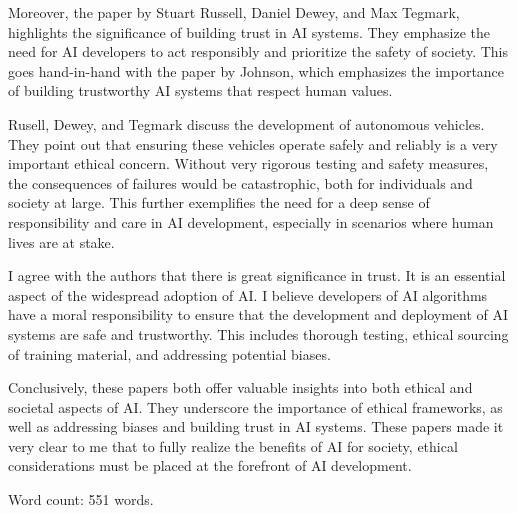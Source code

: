 \documentclass[12pt]{article}
\begin{document}
{Moreover, the paper  by Stuart Russell, Daniel Dewey, and Max Tegmark, highlights the significance of building trust in AI systems\cite{russell2015research}. They emphasize the need for AI developers to act responsibly and prioritize the safety of society. This goes hand-in-hand with the paper by Johnson, which emphasizes the importance of building trustworthy AI systems that respect human values.

Rusell, Dewey, and Tegmark discuss the development of autonomous vehicles. They point out that ensuring these vehicles operate safely and reliably is a very important ethical concern. Without very rigorous testing and safety measures, the consequences of failures would be catastrophic, both for individuals and society at large. This further exemplifies the need for a deep sense of responsibility and care in AI development, especially in scenarios where human lives are at stake.

I agree with the authors that there is great significance in trust. It is an essential aspect of the widespread adoption of AI. I believe developers of AI algorithms have a moral responsibility to ensure that the development and deployment of AI systems are safe and trustworthy. This includes thorough testing, ethical sourcing of training material, and addressing potential biases.

Conclusively, these papers both offer valuable insights into both ethical and societal aspects of AI. They underscore the importance of ethical frameworks, as well as addressing biases and building trust in AI systems. These papers made it very clear to me that to fully realize the benefits of AI for society, ethical considerations must be placed at the forefront of AI development.

Word count: 551 words.
}


\printbibliography[title={References - Nicole}, category=nicole]
\end{document}
